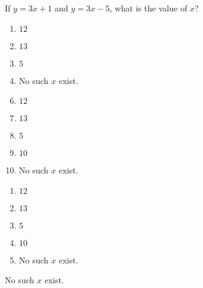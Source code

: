 










 If $y=3x+1$ and $y=3x-5$, what is the value of $x$?


\ifsat
	\begin{enumerate}[label=\Alph*)]
		\item   $12$
		\item  $13$
		\item  $5$
		\item  No such $x$ exist.%
	\end{enumerate}
\else
\fi

\ifacteven
	\begin{enumerate}[label=\textbf{\Alph*.},itemsep=\fill,align=left]
		\setcounter{enumii}{5}
		\item   $12$
		\item  $13$
		\item  $5$
		\addtocounter{enumii}{1}
		\item  $10$
		\item  No such $x$ exist.%
	\end{enumerate}
\else
\fi

\ifactodd
	\begin{enumerate}[label=\textbf{\Alph*.},itemsep=\fill,align=left]
		\item   $12$
		\item  $13$
		\item  $5$
		\item  $10$
		\item  No such $x$ exist.%
	\end{enumerate}
\else
\fi

\ifgridin
  No such $x$ exist.%

\else
\fi


